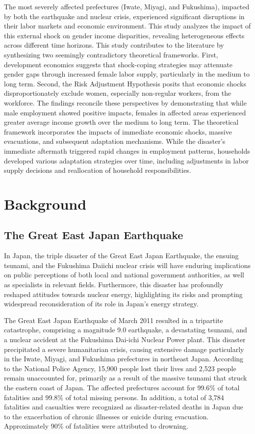 \documentclass[a4paper,12pt]{article}
\begin{document}
The most severely affected prefectures (Iwate, Miyagi, and Fukushima), impacted by both the earthquake and nuclear crisis, experienced significant disruptions in their labor markets and economic environment. This study analyzes the impact of this external shock on gender income disparities, revealing heterogeneous effects across different time horizons.
This study contributes to the literature by synthesizing two seemingly contradictory theoretical frameworks. First, development economics suggests that shock-coping strategies may attenuate gender gaps through increased female labor supply, particularly in the medium to long term. Second, the Risk Adjustment Hypothesis posits that economic shocks disproportionately exclude women, especially non-regular workers, from the workforce. The findings reconcile these perspectives by demonstrating that while male employment showed positive impacts, females in affected areas experienced greater average income growth over the medium to long term.
The theoretical framework incorporates the impacts of immediate economic shocks, massive evacuations, and subsequent adaptation mechanisms. While the disaster's immediate aftermath triggered rapid changes in employment patterns, households developed various adaptation strategies over time, including adjustments in labor supply decisions and reallocation of household responsibilities.

\section{Background}
\label{sec2}

\subsection{The Great East Japan Earthquake }
\label{sec5.1}

 In Japan, the triple disaster of the Great East Japan Earthquake, the ensuing tsunami, and the Fukushima Daiichi nuclear crisis will have enduring implications on public perceptions of both local and national government authorities, as well as specialists in relevant fields. Furthermore, this disaster has profoundly reshaped attitudes towards nuclear energy, highlighting its risks and prompting widespread reconsideration of its role in Japan's energy strategy.


The Great East Japan Earthquake of March 2011 resulted in a tripartite catastrophe, comprising a magnitude 9.0 earthquake, a devastating tsunami, and a nuclear accident at the Fukushima Dai-ichi Nuclear Power plant. This disaster precipitated a severe humanitarian crisis, causing extensive damage particularly in the Iwate, Miyagi, and Fukushima prefectures in northeast Japan. According to the National Police Agency, 15,900 people lost their lives and 2,523 people remain unaccounted for, primarily as a result of the massive tsunami that struck the eastern coast of Japan. The affected prefectures account for 99.6\% of total fatalities and 99.8\% of total missing persons. In addition, a total of 3,784 fatalities and casualties were recognized as disaster-related deaths in Japan due to the exacerbation of chronic illnesses or suicide during evacuation. Approximately 90\% of fatalities were attributed to drowning.
\end{document}
